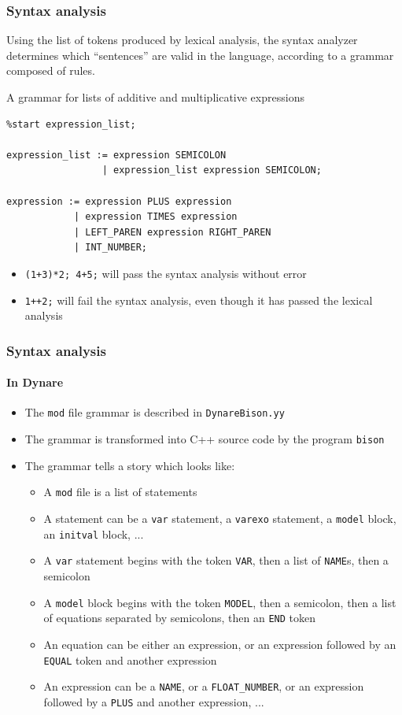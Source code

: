 \documentclass{beamer}
\begin{document}
\begin{frame}[fragile]
\frametitle{Syntax analysis}
Using the list of tokens produced by lexical analysis, the syntax analyzer determines which ``sentences'' are valid in the language, according to a \alert{grammar} composed of \alert{rules}.
\begin{block}{A grammar for lists of additive and multiplicative expressions}
\begin{footnotesize}
\begin{verbatim}
%start expression_list;

expression_list := expression SEMICOLON
                 | expression_list expression SEMICOLON;

expression := expression PLUS expression
            | expression TIMES expression
            | LEFT_PAREN expression RIGHT_PAREN
            | INT_NUMBER;
\end{verbatim}
\end{footnotesize}
\end{block}
\begin{itemize}
\item \texttt{(1+3)*2; 4+5;} will pass the syntax analysis without error
\item \texttt{1++2;} will fail the syntax analysis, even though it has passed the lexical analysis
\end{itemize}
\end{frame}

\begin{frame}
\frametitle{Syntax analysis}
\framesubtitle{In Dynare}
\begin{itemize}
\item The \texttt{mod} file grammar is described in \texttt{DynareBison.yy}
\item The grammar is transformed into C++ source code by the program \texttt{bison}
\item The grammar tells a story which looks like:
  \begin{itemize}
  \item A \texttt{mod} file is a list of statements
  \item A statement can be a \texttt{var} statement, a \texttt{varexo} statement, a \texttt{model} block, an \texttt{initval} block, ...
  \item A \texttt{var} statement begins with the token \texttt{VAR}, then a list of \texttt{NAME}s, then a semicolon
  \item A \texttt{model} block begins with the token \texttt{MODEL}, then a semicolon, then a list of equations separated by semicolons, then an \texttt{END} token
  \item An equation can be either an expression, or an expression followed by an \texttt{EQUAL} token and another expression
  \item An expression can be a \texttt{NAME}, or a \texttt{FLOAT\_NUMBER}, or an expression followed by a \texttt{PLUS} and another expression, ...
  \end{itemize}
\end{itemize}
\end{frame}
\end{document}
